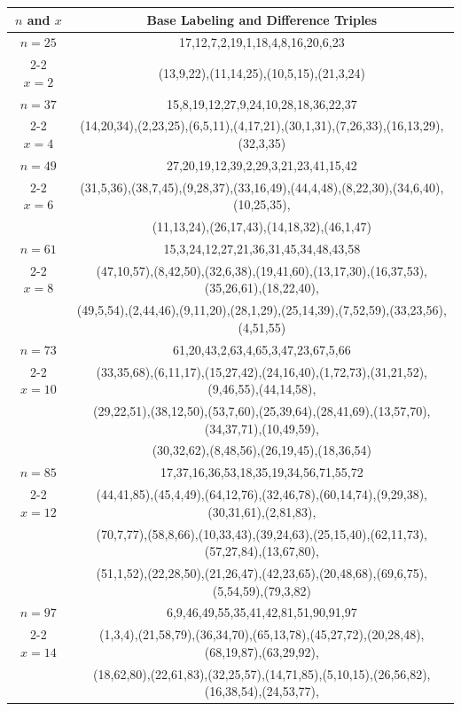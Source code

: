 \begin{tabular}{| c | c |}
\hline
\(n\) and \(x\) & Base Labeling and Difference Triples\\
\hline
\(n=25\) & 
17,12,7,2,19,1,18,4,8,16,20,6,23\\
\cline{2-2}
\(x=2\)
&(13,9,22),(11,14,25),(10,5,15),(21,3,24)\\
\hline 
\(n=37\) & 
15,8,19,12,27,9,24,10,28,18,36,22,37\\
\cline{2-2}
\(x=4\)
&(14,20,34),(2,23,25),(6,5,11),(4,17,21),(30,1,31),(7,26,33),(16,13,29),(32,3,35)\\
\hline 
\(n=49\) & 
27,20,19,12,39,2,29,3,21,23,41,15,42\\
\cline{2-2}
\(x=6\)
&(31,5,36),(38,7,45),(9,28,37),(33,16,49),(44,4,48),(8,22,30),(34,6,40),(10,25,35),\\
&(11,13,24),(26,17,43),(14,18,32),(46,1,47)\\
\hline 
\(n=61\) & 
15,3,24,12,27,21,36,31,45,34,48,43,58\\
\cline{2-2}
\(x=8\)
&(47,10,57),(8,42,50),(32,6,38),(19,41,60),(13,17,30),(16,37,53),(35,26,61),(18,22,40),\\
&(49,5,54),(2,44,46),(9,11,20),(28,1,29),(25,14,39),(7,52,59),(33,23,56),(4,51,55)\\
\hline 
\(n=73\) & 
61,20,43,2,63,4,65,3,47,23,67,5,66\\
\cline{2-2}
\(x=10\)
&(33,35,68),(6,11,17),(15,27,42),(24,16,40),(1,72,73),(31,21,52),(9,46,55),(44,14,58),\\
&(29,22,51),(38,12,50),(53,7,60),(25,39,64),(28,41,69),(13,57,70),(34,37,71),(10,49,59),\\
&(30,32,62),(8,48,56),(26,19,45),(18,36,54)\\
\hline 
\(n=85\) & 
17,37,16,36,53,18,35,19,34,56,71,55,72\\
\cline{2-2}
\(x=12\)
&(44,41,85),(45,4,49),(64,12,76),(32,46,78),(60,14,74),(9,29,38),(30,31,61),(2,81,83),\\
&(70,7,77),(58,8,66),(10,33,43),(39,24,63),(25,15,40),(62,11,73),(57,27,84),(13,67,80),\\
&(51,1,52),(22,28,50),(21,26,47),(42,23,65),(20,48,68),(69,6,75),(5,54,59),(79,3,82)\\
\hline 
\(n=97\) & 
6,9,46,49,55,35,41,42,81,51,90,91,97\\
\cline{2-2}
\(x=14\)
&(1,3,4),(21,58,79),(36,34,70),(65,13,78),(45,27,72),(20,28,48),(68,19,87),(63,29,92),\\
&(18,62,80),(22,61,83),(32,25,57),(14,71,85),(5,10,15),(26,56,82),(16,38,54),(24,53,77),\\

\end{tabular}
